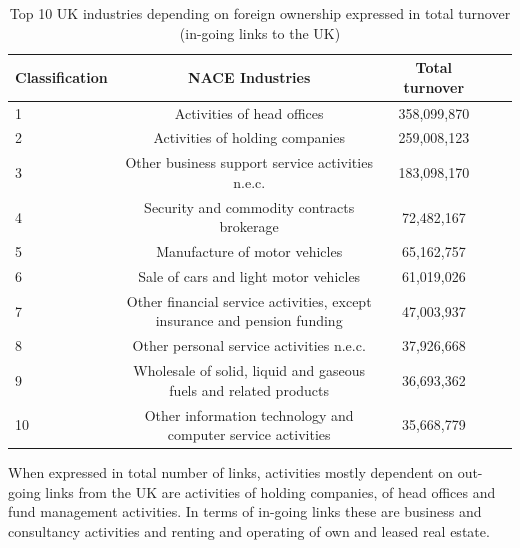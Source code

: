 \documentclass[10pt,letterpaper]{article}
\begin{document}
\begin{table}[!ht]
\begin{adjustwidth}{-2.25in}{0in}
\caption{Top 10 UK industries depending on foreign ownership expressed in total turnover (in-going links to the UK)\label{tab:uk_ingoing}}
\centering
\medskip
\begin{tabular}{|l|c|c|c|c|}
\hline
Classification  & NACE Industries & Total turnover \\ 
\hline
1 &      Activities of head offices &  358,099,870  \\
\hline
2 & Activities of holding companies  & 259,008,123  \\
\hline
3 & Other business support service activities n.e.c. & 183,098,170 \\
\hline
4 &  Security and commodity contracts brokerage  &  72,482,167 \\
\hline
5 &  Manufacture of motor vehicles  &   65,162,757 \\
\hline
6 &  Sale of cars and light motor vehicles  &    61,019,026  \\
\hline
7 &  Other financial service activities, except insurance and pension funding & 47,003,937 \\
\hline
8 &  Other personal service activities n.e.c.  & 37,926,668  \\
\hline
9 &  Wholesale of solid, liquid and gaseous fuels and related products & 36,693,362 \\
\hline
10 &  Other information technology and computer service activities  &  35,668,779 \\
\hline
\end{tabular}
\end{adjustwidth}
\end{table}

\newpage
When expressed in total number of links, activities mostly dependent on out-going links from the UK are activities of holding companies, of head offices and fund management activities. In terms of in-going links these are business and consultancy activities and renting and operating of own and leased real estate.
\end{document}

